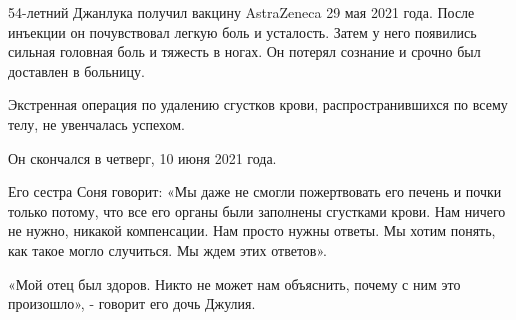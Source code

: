 54-летний Джанлука получил вакцину AstraZeneca 29 мая 2021 года. После инъекции
он почувствовал легкую боль и усталость. Затем у него появились сильная головная
боль и тяжесть в ногах. Он потерял сознание и срочно был доставлен в больницу.

Экстренная операция по удалению сгустков крови, распространившихся по всему
телу, не увенчалась успехом.

Он скончался в четверг, 10 июня 2021 года.

Его сестра Соня говорит: «Мы даже не смогли пожертвовать его печень и почки
только потому, что все его органы были заполнены сгустками крови. Нам ничего не
нужно, никакой компенсации. Нам просто нужны ответы. Мы хотим понять, как такое
могло случиться. Мы ждем этих ответов».

«Мой отец был здоров. Никто не может нам объяснить, почему с ним это произошло»,
- говорит его дочь Джулия.
